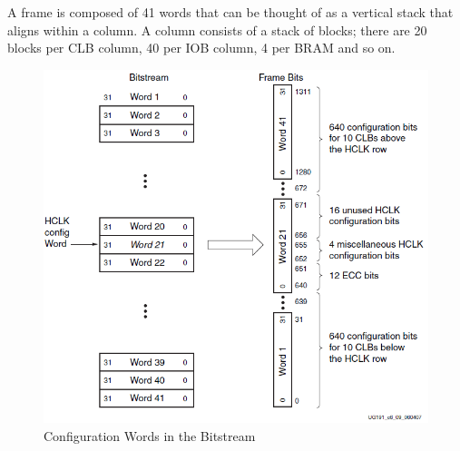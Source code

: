 \documentclass[conference]{IEEEtran}
\begin{document}
A frame is composed of 41 words that can be thought of as a vertical stack that aligns within a column.
A column consists of a stack of blocks; there are 20 blocks per \acrshort{CLB} column, 40 per \acrshort{IOB} column, 4 per \acrshort{BRAM} and so on.
\begin{figure}[h]
	\centering
	\includegraphics[width=1\linewidth]{../Thesis/Figures/frameTileMap}
	\caption[Configuration Words in the Bitstream~\cite{virtex5ConfigGuide}]{Configuration Words in the Bitstream~\cite{virtex5ConfigGuide}}
	\label{fig:frameTileMap}
\end{figure}
\end{document}
